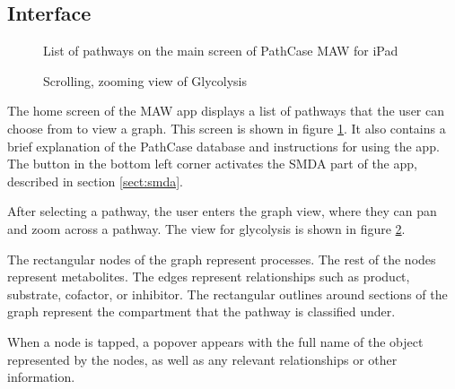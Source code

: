 \subsection{Interface}
\label{sect:maw_interface}

\begin{figure}[htb]
    \center{
        \texttt{[image: maw/figures/screenshot\_list]}}
    \caption{\label{fig:maw_screenshot_list} List of pathways on the main screen
    of PathCase MAW for iPad}
\end{figure}

\begin{figure}[hbt]
    \caption{\label{fig:maw_screenshot_pathway} Scrolling, zooming view of
    Glycolysis}
\end{figure}

The home screen of the MAW app displays a list of pathways that the user can
choose from to view a graph. This screen is shown in figure
\ref{fig:maw_screenshot_list}. It also contains a brief explanation of the
PathCase database and instructions for using the app. The button in the bottom
left corner activates the SMDA part of the app, described in section
\ref{sect:smda}.

After selecting a pathway, the user enters the graph view, where they can pan
and zoom across a pathway. The view for glycolysis is shown in figure
\ref{fig:maw_screenshot_pathway}.

The rectangular nodes of the graph represent processes. The rest of the nodes
represent metabolites. The edges represent relationships such as product,
substrate, cofactor, or inhibitor. The rectangular outlines around sections of
the graph represent the compartment that the pathway is classified under.

When a node is tapped, a popover appears with the full name of the object
represented by the nodes, as well as any relevant relationships or other
information.
